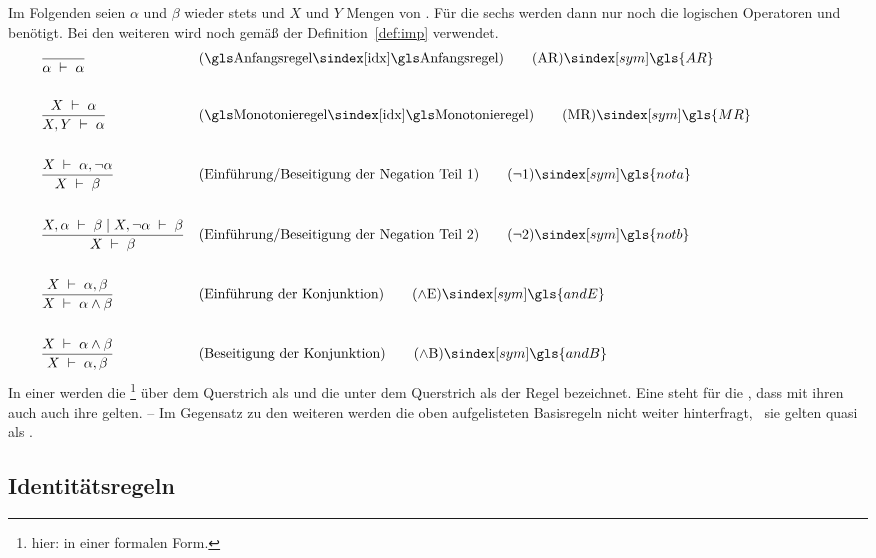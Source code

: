 {Im Folgenden seien $\alpha$ und $\beta$ wieder stets  und $X$ und $Y$ Mengen von .
Für die sechs  werden dann nur noch die logischen Operatoren \symqt{\lnot} und \symqt{\land} benötigt.
Bei den weiteren  wird noch \symqt{\limp} gemäß der Definition~\vref{def:imp} verwendet.
%
\begin{align}
	& \frac{}{\alpha\derive\alpha}
	& & (\text{\glsIdx{Anfangsregel}})
	\tag{\tagAR} \sym{\gls{AR}} \label{def:Anfangsregel}
	\\\\
	& \frac{X\derive\alpha}{X,Y\derive\alpha}
	& & (\text{\glsIdx{Monotonieregel}})
	\tag{\tagMR} \sym{\gls{MR}} \label{def:Monotonieregel}
	\\\\
	& \frac{X\derive\alpha,\lnot\alpha}{X\derive\beta}
	& & (\text{Einführung/Beseitigung der Negation Teil 1})
	\tag{\tagnota} \sym{\gls{nota}} \label{def:nota}
	\\\\
	& \frac{X,\alpha\derive\beta \srand X,\lnot\alpha\derive\beta}{X\derive\beta}
	& & (\text{Einführung/Beseitigung der Negation Teil 2})
	\tag{\tagnotb} \sym{\gls{notb}} \label{def:notb}
	\\\\
	& \frac{X\derive\alpha,\beta}{X\derive\alpha\land\beta}
	& & (\text{Einführung der Konjunktion})
	\tag{\tagandE} \sym{\gls{andE}} \label{def:andE}
	\\\\
	& \frac{X\derive\alpha\land\beta}{X\derive\alpha,\beta}
	& & (\text{Beseitigung der Konjunktion})
	\tag{\tagandB} \sym{\gls{andB}} \label{def:andB}
	\formulatoleft
\end{align}
%
In einer  werden die %
\footnote{hier:  in einer formalen Form.}
über dem Querstrich als \emph{} und die unter dem Querstrich als \emph{} der Regel bezeichnet.
Eine  steht für die , dass mit ihren  auch auch ihre  gelten.
-- Im Gegensatz zu den weiteren  werden die oben aufgelisteten Basisregeln nicht weiter hinterfragt, \textdh\ sie gelten quasi als .

\subsection{Identitätsregeln}%
\label{sub:Identitätsregeln}

}
